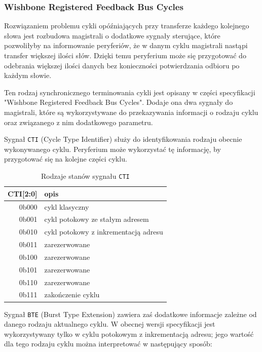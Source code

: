\subsubsection{Wishbone Registered Feedback Bus Cycles}

Rozwiązaniem problemu cykli opóźniających przy transferze każdego kolejnego słowa jest rozbudowa magistrali o dodatkowe sygnały sterujące, które pozwoliłyby na informowanie peryferiów, że w danym cyklu magistrali nastąpi transfer większej ilości słów. Dzięki temu peryferium może się przygotować do odebrania większej ilości danych bez konieczności potwierdzania odbioru po każdym słowie.

Ten rodzaj synchronicznego terminowania cykli jest opisany w części specyfikacji "Wishbone Registered Feedback Bus Cycles". Dodaje ona dwa sygnały do magistrali, które są wykorzystywane do przekazywania informacji o rodzaju cyklu oraz związanego z nim dodatkowego parametru.

Sygnał \texttt{CTI} (Cycle Type Identifier) służy do identyfikowania rodzaju obecnie wykonywanego cyklu. Peryferium może wykorzystać tę informację, by przygotować się na kolejne części cyklu.
\begin{table}[H]
\begin{center}
\begin{tabular}{ r|l }
 CTI[2:0] & opis \\ 
 \hline
 0b000 & cykl klasyczny \\
 0b001 & cykl potokowy ze stałym adresem \\
 0b010 & cykl potokowy z inkrementacją adresu \\
 0b011 & zarezerwowane \\
 0b100 & zarezerwowane \\
 0b101 & zarezerwowane \\
 0b110 & zarezerwowane \\
 0b111 & zakończenie cyklu \\
 \hline
\end{tabular}
\end{center}
\caption{\label{tab:signal-states-cti}Rodzaje stanów sygnału \texttt{CTI}}
\end{table}

Sygnał \texttt{BTE} (Burst Type Extension) zawiera zaś dodatkowe informacje zależne od danego rodzaju aktualnego cyklu.
W obecnej wersji specyfikacji jest wykorzystywany tylko w cyklu potokowym z inkrementacją adresu; jego wartość dla tego rodzaju cyklu można interpretować w następujący sposób:

